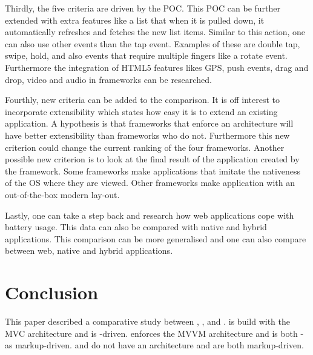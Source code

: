 \documentclass[a4paper]{artikel3}
\begin{document}
Thirdly, the five criteria are driven by the POC.
This POC can be further extended with extra features like a list that when it is pulled down, it automatically refreshes and fetches the new list items.
Similar to this action, one can also use other events than the tap event.
Examples of these are double tap, swipe, hold, and also events that require multiple fingers like a rotate event.
Furthermore the integration of HTML5 features likes GPS, push events, drag and drop, video and audio in frameworks can be researched.

Fourthly, new criteria can be added to the comparison.
It is off interest to incorporate extensibility which states how easy it is to extend an existing application.
A hypothesis is that frameworks that enforce an architecture will have better extensibility than frameworks who do not.
Furthermore this new criterion could change the current ranking of the four frameworks.
Another possible new criterion is to look at the final result of the application created by the framework.
Some frameworks make applications that imitate the nativeness of the OS where they are viewed.
Other frameworks make application with an out-of-the-box modern lay-out.

Lastly, one can take a step back and research how web applications cope with battery usage.
This data can also be compared with native and hybrid applications.
This comparison can be more generalised and one can also compare between web, native and hybrid applications.


\section{Conclusion} %
\label{sec:conclusion}


This paper described a comparative study between \sta{},  \kendoa{},  \jqma{} and \lungo{}.
\sta{} is build with the MVC architecture and is \js-driven.
\kendoa{} enforces the MVVM architecture and is both \js- as markup-driven.
\jqma{} and \lungo{} do not have an architecture and are both markup-driven.
\end{document}
